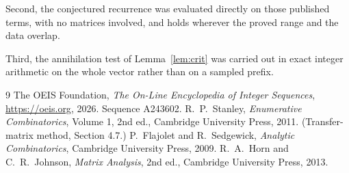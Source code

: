 \documentclass[11pt,a4paper]{article}
\theoremstyle{plain}
\theoremstyle{definition}
\begin{document}
Second, the conjectured recurrence was evaluated directly on those published terms, with no
matrices involved, and holds wherever the proved range and the data overlap.

Third, the annihilation test of Lemma~\ref{lem:crit} was carried out in exact integer
arithmetic on the whole vector rather than on a sampled prefix.

\begin{thebibliography}{9}
 The OEIS Foundation, \emph{The On-Line Encyclopedia of Integer
Sequences}, \url{https://oeis.org}, 2026. Sequence A243602.
 R.~P.~Stanley, \emph{Enumerative Combinatorics}, Volume 1, 2nd ed.,
Cambridge University Press, 2011. (Transfer-matrix method, Section 4.7.)
 P.~Flajolet and R.~Sedgewick, \emph{Analytic Combinatorics}, Cambridge
University Press, 2009.
 R.~A.~Horn and C.~R.~Johnson, \emph{Matrix Analysis}, 2nd ed., Cambridge
University Press, 2013.
\end{thebibliography}
\end{document}
